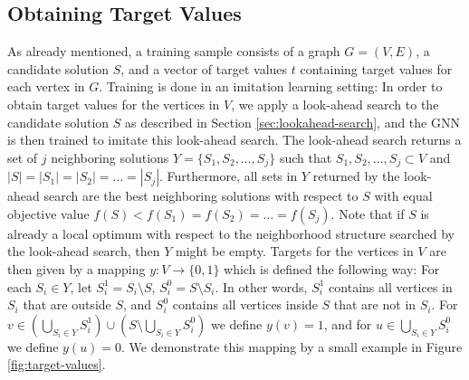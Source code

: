 \documentclass[draft,final]{vutinfth} %
\begin{document}
\subsection{Obtaining Target Values}\label{subsec:target-values}
As already mentioned, a training sample consists of a graph $G = (V,E)$, a candidate solution $S$, and a vector of target values $t$ containing target values for each vertex in $G$. Training is done in an imitation learning setting: In order to obtain target values for the vertices in $V$, we apply a look-ahead search to the candidate solution $S$ as described in Section \ref{sec:lookahead-search}, and the GNN is then trained to imitate this look-ahead search. 
The look-ahead search returns a set of $j$ neighboring solutions $Y = \{S_1, S_2, \dots, S_j\}$ such that $S_1, S_2, \dots, S_j \subset V$ and $|S| = |S_1| = |S_2| = \dots = |S_j|$. Furthermore, all sets in $Y$ returned by the look-ahead search are the best neighboring solutions with respect to $S$ with equal objective value $f(S) < f(S_1) = f(S_2) = \dots = f(S_j)$. Note that if $S$ is already a local optimum with respect to the neighborhood structure searched by the look-ahead search, then $Y$ might be empty. Targets for the vertices in $V$ are then given by a mapping $y \colon V \rightarrow \{0,1\}$ which is defined the following way: For each $S_i \in Y$, let $S_{i}^1 = S_i \setminus S$, $S_{i}^0 = S \setminus S_i$. In other words, $S_i^1$ contains all vertices in $S_i$ that are outside $S$, and $S_i^0$ contains all vertices inside $S$ that are not in $S_i$. For $v \in (\bigcup_{S_i \in Y} S_i^1) \cup (S \setminus \bigcup_{S_i \in Y} S_i^0)$ we define $y(v) = 1$, and for $u \in \bigcup_{S_i \in Y} S_i^0$ we define $y(u) = 0 $. We demonstrate this mapping by a small example in Figure \ref{fig:target-values}. 

\end{document}

